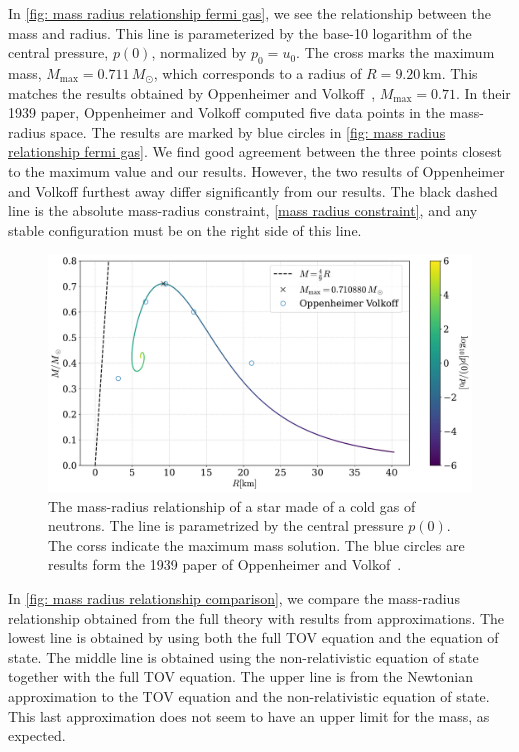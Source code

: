 In \autoref{fig: mass radius relationship fermi gas}, we see the relationship between the mass and radius.
This line is parameterized by the base-10 logarithm of the central pressure, $p(0)$, normalized by $p_0 = u_0$.
The cross marks the maximum mass, $M_\mathrm{max} = 0.711 \, M_\odot$, which corresponds to a radius of $R = 9.20 \, \mathrm{km}$.
This matches the results obtained by Oppenheimer and Volkoff~\cite{oppenheimerMassiveNeutronCores1939}, $M_\mathrm{max} = 0.71$.
In their 1939 paper, Oppenheimer and Volkoff computed five data points in the mass-radius space.
The results are marked by blue circles in \autoref{fig: mass radius relationship fermi gas}.
We find good agreement between the three points closest to the maximum value and our results.
However, the two results of Oppenheimer and Volkoff furthest away differ significantly from our results.
The black dashed line is the absolute mass-radius constraint, \autoref{mass radius constraint}, and any stable configuration must be on the right side of this line.


\begin{figure}[h]
    \centering
    \includegraphics[width=\textwidth]{../scripts/figurer/mass_radius_neutron.pdf}
    \caption{The mass-radius relationship of a star made of a cold gas of neutrons. The line is parametrized by the central pressure $p(0)$. The corss indicate the maximum mass solution. The blue circles are results form the 1939 paper of Oppenheimer and Volkof~\autocite{oppenheimerMassiveNeutronCores1939}.}
    \label{fig: mass radius relationship fermi gas}
\end{figure}


In \autoref{fig: mass radius relationship comparison}, we compare the mass-radius relationship obtained from the full theory with results from approximations.
The lowest line is obtained by using both the full TOV equation and the equation of state.
The middle line is obtained using the non-relativistic equation of state together with the full TOV equation.
The upper line is from the Newtonian approximation to the TOV equation and the non-relativistic equation of state.
This last approximation does not seem to have an upper limit for the mass, as expected.


